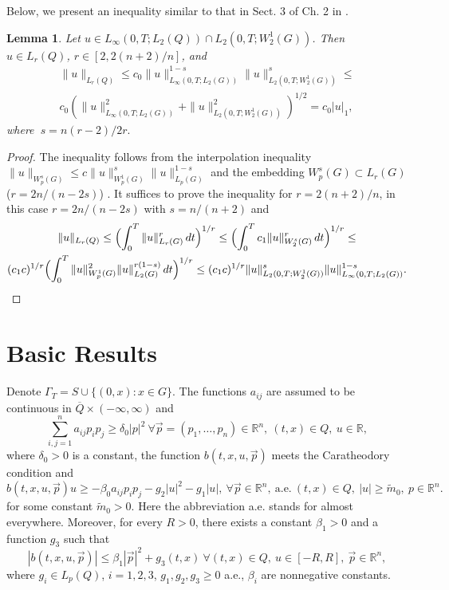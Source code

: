 \documentclass{article}
\theoremstyle{plain}
\newtheorem{lemma}{Lemma}
\begin{document}
Below, we present an  inequality similar to that in Sect. 3 of Ch. 2 in \cite{lad}.

\begin{lemma}\label{lem1}
Let  $u\in L_\infty(0,T;L_2(Q))\cap L_2(0,T;W_2^1(G))$. Then  $u\in L_r(Q)$, $r\in [2, 2(n+2)/n]$, and 
\begin{multline*}
\|u\|_{L_r(Q)}\leq c_0\|u\|_{L_\infty(0,T;L_2(G))}^{1-s} \|u\|_{L_2(0,T;W_2^1(G))}^s\leq \\
c_0(\|u\|_{L_\infty(0,T;L_2(G))}^2+ \|u\|_{L_2(0,T;W_2^1(G))}^2)^{1/2}=c_0|u|_1, 
\end{multline*}
where $\  s=n(r-2)/2r.$
\end{lemma}
\begin{proof}
The inequality follows from the interpolation inequality    $\|u\|_{W_p^s(G)}\leq c \|u\|_{W_p^1(G)}^s \|u\|_{L_p(G)}^{1-s}$ \cite{tri} 
and the embedding  $W_p^s(G)\subset L_r(G)$ ($r=2n/(n-2s)$) \cite[Sect.  4.6.1, 4.6.2]{tri}. It suffices to prove the inequality 
for $r=2(n+2)/n$, in this case 
$r=2n/(n-2s)$ with $s=n/(n+2)$ and 
\begin{multline*}
\|u\|_{L_r(Q)}\leq \Bigl(\int_0^T \|u\|_{L_r(G)}^r\,dt\Bigr)^{1/r}\leq \Bigl(\int_0^T c_1\|u\|_{W_2^s(G)}^r\,dt\Bigr)^{1/r}\leq \\
(c_1c)^{1/r}\Bigl(\int_0^T  \|u\|_{W_p^1(G)}^{2} \|u\|_{L_2(G)}^{r(1-s)}\,dt\Bigr)^{1/r}\leq (c_1c)^{1/r} 
\|u\|_{L_2(0,T;W_2^1(G))}^s \|u\|_{L_\infty(0,T;L_2(G))}^{1-s}.
\end{multline*}
\end{proof}


\section{Basic Results}

Denote  $\Gamma_T=S\cup \{(0,x): x\in G\}$.
The functions $a_{ij}$ are assumed to be continuous in $\overline{Q}\times (-\infty,\infty)$ and
\begin{equation}\label{e6}
\sum_{i,j=1}^na_{ij}p_ip_j\geq \delta_0|p|^2\  \forall \vec{p}=(p_1,\ldots,p_n) \in {\mathbb R}^n, \ (t,x)\in Q, \ u\in {\mathbb R},
\end{equation}
where $\delta_0>0$ is a constant, the function 
  $b(t,x,u,\vec{p})$ meets the Caratheodory condition and
\begin{equation}\label{e7}
b(t,x,u, \vec{p})u\geq -\beta_0a_{ij}p_ip_j -  g_2 |u|^2-g_1|u|,\  \forall \vec{p}\in {\mathbb R}^n, \ \textrm{a.e.}\ (t,x)\in Q, \  |u|\geq \tilde{m}_0, \ p\in {\mathbb R}^n.
\end{equation}
for some constant  $\tilde{m}_0>0$. Here the abbreviation a.e. stands for almost  everywhere.
Moreover, for every $R>0$, there exists a constant  $\beta_1>0$ and a function $g_3$ such that 
\begin{equation}\label{e8}
|b(t,x,u, \vec{p})|\leq \beta_1 |\vec{p}|^2 +g_3(t,x)\   \forall  (t,x)\in Q, \  u\in [-R,R], \ \vec{p}\in {\mathbb R}^n,
\end{equation}
where  $g_i\in L_{p}(Q)$, $i=1,2,3$, $g_1,g_2,g_3\geq 0$ a.e., $\beta_i$ are nonnegative constants. 
\end{document}
